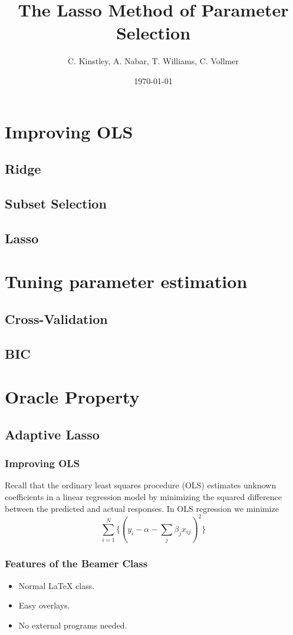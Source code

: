 \documentclass{beamer}
\title{The Lasso Method of Parameter Selection}
\author{C. Kinstley, A. Nabar, T. Williams, C. Vollmer }
\date{\today}
\begin{document}
\frame{\titlepage}

\section[Outline]{}
\frame{\tableofcontents}

\section{Improving OLS}
\subsection{Ridge}
\subsection{Subset Selection}
\subsection{Lasso}

\section{Tuning parameter estimation}
\subsection{Cross-Validation}
\subsection{BIC}

\section{Oracle Property}
\subsection{Adaptive Lasso}

\frame
{
\frametitle{Improving OLS}
	Recall that the ordinary least squares procedure (OLS) estimates unknown coefficients in a linear regression model by minimizing the squared difference between the predicted and actual responses.
	In OLS regression we minimize
	\begin{equation*}
\sum_{i=1}^N\{(y_i - \alpha-\sum_j\beta_jx_{ij} )^2 \}
	\end{equation*}
}


\frame
{
  \frametitle{Features of the Beamer Class}

  \begin{itemize}
  \item<1-> Normal LaTeX class.
  \item<2-> Easy overlays.
  \item<3-> No external programs needed.      
  \end{itemize}
}
\end{document}
